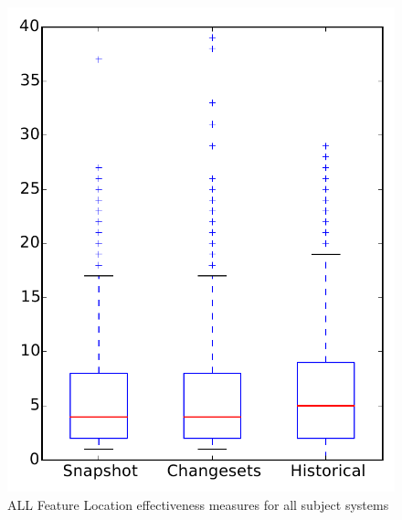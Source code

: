 
\begin{figure}
\centering
\includegraphics[height=0.4\textheight]{figures/flt/all_overview}
\caption{ALL Feature Location effectiveness measures for all subject systems}
\label{fig:flt:all:overview}
\end{figure}
